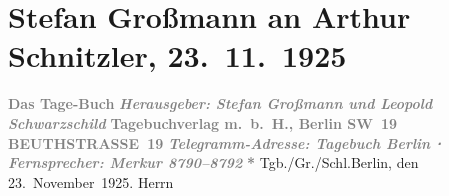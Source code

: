 

         
         \renewcommand{\erwaehntePersonen}{Personen: Stefan Großmann, Leopold Schwarzschild}
         \renewcommand{\erwaehnteInstitutionen}{Institutionen: Das Tage-Buch}
         \renewcommand{\erwaehnteOrte}{Orte: Berlin, Beuthstrasse, Sternwartestraße, Wien, XVIII., Währing}
         \renewcommand{\erwaehnteWerke}{}
               \section[Stefan Großmann an Arthur Schnitzler, 23. 11. 1925]{ Stefan Großmann an Arthur Schnitzler, 23. 11. 1925}\nopagebreak{}\rehead{ }\begin{ledgroupsized}[t]{13cm}\normalsize\beginnumbering \toendnotes[C]{\smallbreak\pagebreak[2]} 
\pstart
           \noindent{}\centering{}{\pb}\textcolor{gray}{\textbf{Das Tage-Buch}}\pend
           \pstart
           \noindent{}\centering{}\textcolor{gray}{\textbf{\emph{Herausgeber: Stefan Großmann und Leopold Schwarzschild}}}\pend
           \pstart
           \noindent{}\centering{}\textcolor{gray}{\textbf{Tagebuchverlag m. b. H., Berlin SW 19}}\pend
           \pstart
           \noindent{}\centering{}\textcolor{gray}{\textbf{BEUTHSTRASSE 19}}\pend
           \pstart
           \noindent{}\centering{}\textcolor{gray}{\textbf{\emph{Telegramm-Adresse: Tagebuch Berlin ⋅ Fernsprecher: Merkur 8790–8792}}}\pend
           \pstart
           \noindent{}\centering{}\textcolor{gray}{\textbf{\emph{}}}\pend
           \pstart
           \noindent{}\centering{}\textcolor{gray}{\textbf{*}}\pend
           \pstart
           \noindent{}Tgb./Gr./Schl.\hfill Berlin, den
                     23. November 1925.\pend
           \pstart
           \raggedleft{}Herrn\pend
           \pstart

\end{ledgroupsized}
